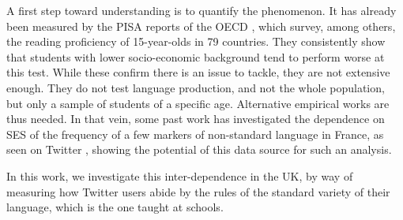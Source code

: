 \documentclass[../thesis.tex]{subfiles}
\begin{document}
A first step toward understanding is to quantify the phenomenon. It has already been
measured by the PISA reports of the OECD \cite{OECDWhereAll2019}, which survey, among
others, the reading proficiency of 15-year-olds in 79 countries. They consistently show
that students with lower socio-economic background tend to perform worse at this test.
While these confirm there is an issue to tackle, they are not extensive enough. They do
not test language production, and not the whole population, but only a sample of
students of a specific age. Alternative empirical works are thus needed. In that vein,
some past work has investigated the dependence on \ac{SES} of the frequency of a few markers
of non-standard language in France, as seen on Twitter
\cite{LevyAbitbolSocioeconomicDependencies2018}, showing the potential of this data
source for such an analysis.

In this work, we investigate this inter-dependence in the UK, by way of measuring how Twitter users abide by the rules of the standard variety of their language, which is the one taught at schools.
\end{document}
